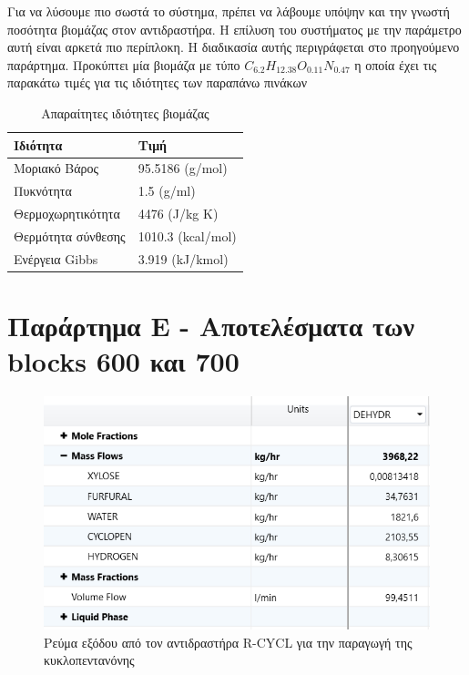 \documentclass[11pt]{article}
\begin{document}
Για να λύσουμε πιο σωστά το σύστημα, πρέπει να λάβουμε υπόψην και την γνωστή ποσότητα βιομάζας στον αντιδραστήρα. Η επίλυση του συστήματος με την παράμετρο αυτή είναι αρκετά πιο περίπλοκη. Η διαδικασία αυτής περιγράφεται στο προηγούμενο παράρτημα. Προκύπτει μία βιομάζα με τύπο \(C_{6.2}H_{12.38}O_{0.11}N_{0.47}\) η οποία έχει τις παρακάτω τιμές για τις ιδιότητες των παραπάνω πινάκων

\pagebreak

\begin{table}[htbp]
\caption{Απαραίτητες ιδιότητες βιομάζας}
\centering
\begin{tabular}{ll}
Ιδιότητα & Τιμή\\
\hline
Μοριακό Βάρος & 95.5186 (g/mol)\\
Πυκνότητα & 1.5 (g/ml)\\
Θερμοχωρητικότητα & 4476 (J/kg K)\\
Θερμότητα σύνθεσης & 1010.3 (kcal/mol)\\
Ενέργεια Gibbs & 3.919 (kJ/kmol)\\
\end{tabular}
\end{table}

\section{Παράρτημα E - Αποτελέσματα των blocks 600 και 700}
\label{sec:org218893a}
\begin{figure}[htbp]
\centering
\includegraphics[width=.9\linewidth]{Παράρτημα/2023-01-13_18-10-03_screenshot.png}
\caption{Ρεύμα εξόδου από τον αντιδραστήρα R-CYCL για την παραγωγή της κυκλοπεντανόνης}
\end{figure}
\end{document}
